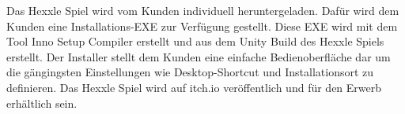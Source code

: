 \documentclass[../main.tex]{subfiles}
\begin{document}
	
	Das Hexxle Spiel wird vom Kunden individuell heruntergeladen. Dafür wird dem Kunden eine Installations-EXE zur Verfügung gestellt.
	Diese EXE wird mit dem Tool Inno Setup Compiler erstellt und aus dem Unity Build des Hexxle Spiels erstellt.
	Der Installer stellt dem Kunden eine einfache Bedienoberfläche dar um die gängingsten Einstellungen wie Desktop-Shortcut und Installationsort zu definieren.
	Das Hexxle Spiel wird auf itch.io veröffentlich und für den Erwerb erhältlich sein.
\end{document}
